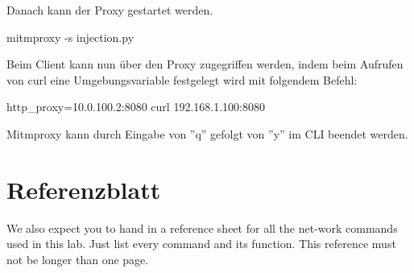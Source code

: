\documentclass[11pt,titlepage]{article}
\newenvironment{shadedquotation}
 {\begin{shaded*}
  \quoting[leftmargin=0pt, vskip=0pt]
 }
 {\endquoting
 \end{shaded*}
}
\begin{document}
Danach kann der Proxy gestartet werden.
\begin{shadedquotation}
	mitmproxy -s injection.py
\end{shadedquotation}

Beim Client kann nun über den Proxy zugegriffen werden, indem beim Aufrufen von curl eine Umgebungsvariable festgelegt wird mit folgendem Befehl:

http\_proxy=10.0.100.2:8080 curl 192.168.1.100:8080

Mitmproxy kann durch Eingabe von ''q'' gefolgt von ''y'' im CLI beendet werden.
\newpage
\section{Referenzblatt}
\label{sec:Referenzblatt}
\begin{shadedquotation}
  We also expect you to hand in a reference sheet for all the net-work commands used in this lab. Just list every command and its function. This reference must not be longer than one page.
\end{shadedquotation}

\par\medskip 
\end{document}
